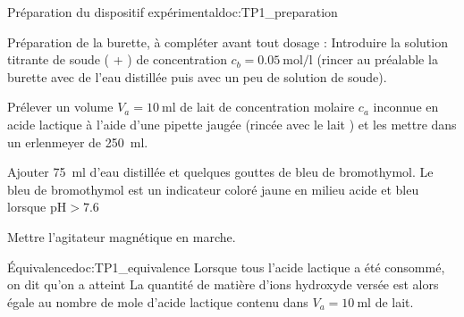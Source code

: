 \begin{doc}{Préparation du dispositif expérimental}{doc:TP1_preparation}
  \begin{protocole}
    \item Préparation de la burette, à compléter avant tout dosage :
    Introduire la solution titrante de soude ( + \hydroxyde) de concentration $c_b = \qty{0,05}{\mol\per\litre}$ (rincer au préalable la burette avec de l’eau distillée puis avec un peu de solution de soude).
    \item Prélever un volume $V_a = \qty{10}{\ml}$ de lait de concentration molaire $c_a$ inconnue en acide lactique à l’aide d’une pipette jaugée (rincée avec le lait ) et les mettre dans un erlenmeyer de \qty{250}{\ml}.
    \item Ajouter \qty{75}{\ml} d’eau distillée et quelques gouttes
    de bleu de bromothymol. Le bleu de bromothymol est un indicateur coloré jaune en milieu acide et bleu lorsque $\text{pH} > \num{7,6}$
    \item Mettre l’agitateur magnétique en marche.
  \end{protocole}
\end{doc}


\begin{doc}{Équivalence}{doc:TP1_equivalence}
  Lorsque tous l'acide lactique a été consommé, on dit qu'on a atteint 
  La quantité de matière d’ions hydroxyde \hydroxyde versée est alors égale au nombre de mole
  d’acide lactique contenu dans $V_a = \qty{10}{\ml}$ de lait.
\end{doc}








